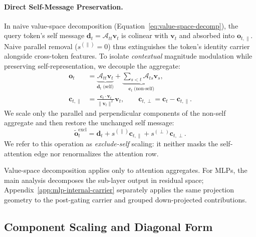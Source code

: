 \paragraph{Direct Self-Message Preservation.}
In naive value-space decomposition (Equation~\ref{eq:value-space-decomp}), the
query token's self message $\mathbf{d}_t = \mathcal{A}_{tt}\mathbf{v}_t$ is
colinear with $\mathbf{v}_t$ and absorbed into $\mathbf{o}_{t,\parallel}$.
Naive parallel removal ($s^{(\parallel)}=0$) thus extinguishes the token's
identity carrier alongside cross-token features. To isolate \textit{contextual}
magnitude modulation while preserving self-representation, we decouple the aggregate:
\begin{equation}
  \begin{aligned}
  \mathbf{o}_t
    &= \underbrace{\mathcal{A}_{tt}\mathbf{v}_t}_{\mathbf{d}_t\;\text{(self)}}
     + \underbrace{\sum_{s<t}\mathcal{A}_{ts}\mathbf{v}_s}_{\mathbf{c}_t\;\text{(non-self)}},\\
  \mathbf{c}_{t,\parallel}
    &= \frac{\mathbf{c}_t \cdot \mathbf{v}_t}{\|\mathbf{v}_t\|^2}\mathbf{v}_t,
  \qquad
  \mathbf{c}_{t,\perp}=\mathbf{c}_t-\mathbf{c}_{t,\parallel}.
  \end{aligned}
  \label{eq:exclude-self-decomp}
\end{equation}
We scale only the parallel and perpendicular components of the non-self
aggregate and then restore the unchanged self message:
\begin{equation}
  \widetilde{\mathbf{o}}^{\mathrm{excl}}_t
    = \mathbf{d}_t
      +s^{(\parallel)}\mathbf{c}_{t,\parallel}
      +s^{(\perp)}\mathbf{c}_{t,\perp}.
  \label{eq:exclude-self-scaling}
\end{equation}
We refer to this operation as \emph{exclude-self} scaling: it neither masks the
self-attention edge nor renormalizes the attention row.

Value-space decomposition applies only to attention aggregates. For MLPs, the
main analysis decomposes the sub-layer output in residual space; Appendix~\ref{app:mlp-internal-carrier}
separately applies the same projection geometry to the post-gating carrier and
grouped down-projected contributions.

\subsection{Component Scaling and Diagonal Form}
\label{sec:closed-form-control}

